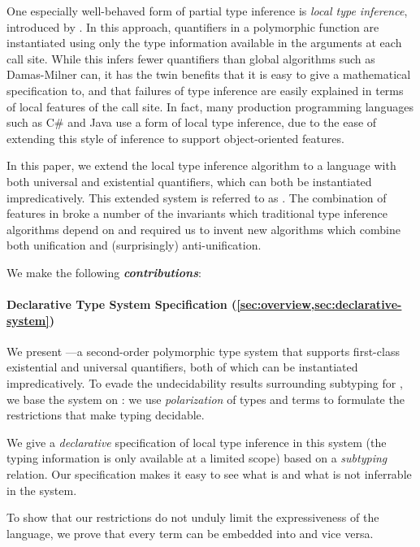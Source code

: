 One especially well-behaved form of partial type inference is 
\emph{local type inference}, introduced by \citet{pierce2000:local}. In this approach,
quantifiers in a polymorphic function are instantiated using only the type
information available in the arguments at each call site. While this infers
fewer quantifiers than global algorithms such as Damas-Milner can, it has the
twin benefits that it is easy to give a mathematical specification to, and that
failures of type inference are easily explained in terms of local features of
the call site. In fact, many production programming languages such as C\# and
Java use a form of local type inference, due to the ease of extending this style
of inference to support object-oriented features. 

In this paper, we extend the local type inference algorithm to a language with
both universal and existential quantifiers, which can both be instantiated
impredicatively. This extended system is referred to as \fexists. The
combination of features in \fexists  broke a number of the invariants which
traditional type inference algorithms depend on and required us to invent
new algorithms which combine both unification and (surprisingly)
anti-unification.

We make the following \emph{\textbf{contributions}}:

\paragraph*{Declarative Type System Specification (\cref{sec:overview,sec:declarative-system})} 
    We present \fexists---a second-order polymorphic type system that supports first-class
    existential and universal quantifiers, both of which can be instantiated
    impredicatively. To evade the undecidability results surrounding subtyping
    for \systemf, we base the system on \CBPV \cite{levy2006:cbpv}: we
    use \emph{polarization} of types and terms to formulate the restrictions
    that make typing decidable. 

    We give a \emph{declarative} specification of local type inference in this
    system (\ie the typing information is only available at a limited scope)
    based on a \emph{subtyping} relation. Our specification makes it easy to see
    what is and what is not inferrable in the system. 

    To show that our restrictions do not unduly limit the expressiveness of the
    language, we prove that every \fexists term can be embedded into \systemf
    and vice versa.


